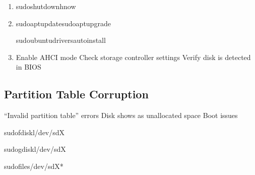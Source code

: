 \documentclass[letterpaper,10pt,english]{sphinxmanual}
\begin{document}
\sphinxAtStartPar
{}
\begin{enumerate}
%
\item {} 
\sphinxAtStartPar
{}

\begin{sphinxVerbatim}[commandchars=\\\{\}]
sudoshutdown\PYGZhy{}hnow
\end{sphinxVerbatim}

\item {} 
\sphinxAtStartPar
{}

\begin{sphinxVerbatim}[commandchars=\\\{\}]
sudoaptupdatesudoaptupgrade

sudoubuntu\PYGZhy{}driversautoinstall
\end{sphinxVerbatim}

\item {} 
\sphinxAtStartPar
{}
\sphinxhyphen{} Enable AHCI mode
\sphinxhyphen{} Check storage controller settings
\sphinxhyphen{} Verify disk is detected in BIOS

\end{enumerate}


\subsection{Partition Table Corruption}
\label{\detokenize{troubleshooting:partition-table-corruption}}
\sphinxAtStartPar
{}
\sphinxhyphen{} “Invalid partition table” errors
\sphinxhyphen{} Disk shows as unallocated space
\sphinxhyphen{} Boot issues

\sphinxAtStartPar
{}

\begin{sphinxVerbatim}[commandchars=\\\{\}]
sudofdisk\PYGZhy{}l/dev/sdX

sudogdisk\PYGZhy{}l/dev/sdX

sudofile\PYGZhy{}s/dev/sdX*
\end{sphinxVerbatim}
\end{document}
